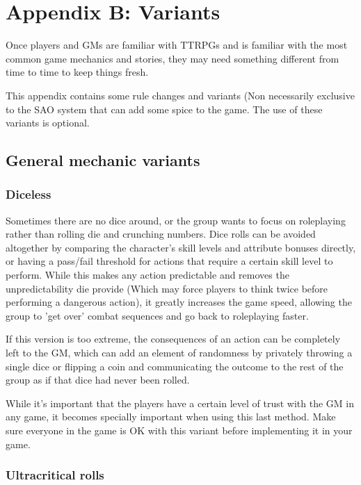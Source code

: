 \chapter{Appendix B: Variants}

Once players and GMs are familiar with TTRPGs and is familiar with the most common game mechanics and stories, they may need something different from time to time to keep things fresh. 
\par
This appendix contains some rule changes and variants (Non necessarily exclusive to the SAO system that can add some spice to the game. The use of these variants is optional.

\section{General mechanic variants}

\subsection*{Diceless}

Sometimes there are no dice around, or the group wants to focus on roleplaying rather than rolling die and crunching numbers. Dice rolls can be avoided altogether by comparing the character's skill levels and attribute bonuses directly, or having a pass/fail threshold for actions that require a certain skill level to perform. While this makes any action predictable and removes the unpredictability die provide (Which may force players to think twice before performing a dangerous action), it greatly increases the game speed, allowing the group to 'get over' combat sequences and go back to roleplaying faster.
\par 
If this version is too extreme, the consequences of an action can be completely left to the GM, which can add an element of randomness by privately throwing a single dice or flipping a coin and communicating the outcome to the rest of the group as if that dice had never been rolled.
\par 
While it's important that the players have a certain level of trust with the GM in any game, it becomes specially important when using this last method. Make sure everyone in the game is OK with this variant before implementing it in your game.

\subsection*{Ultracritical rolls}

